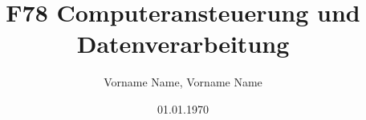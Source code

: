 \documentclass[12pt]{article}
\title{F78 Computeransteuerung und Datenverarbeitung}
\author{Vorname Name, Vorname Name}
\date{01.01.1970}
\begin{document}

\maketitle

\begin{snugshade*}
    
\end{snugshade*}






\end{document}
